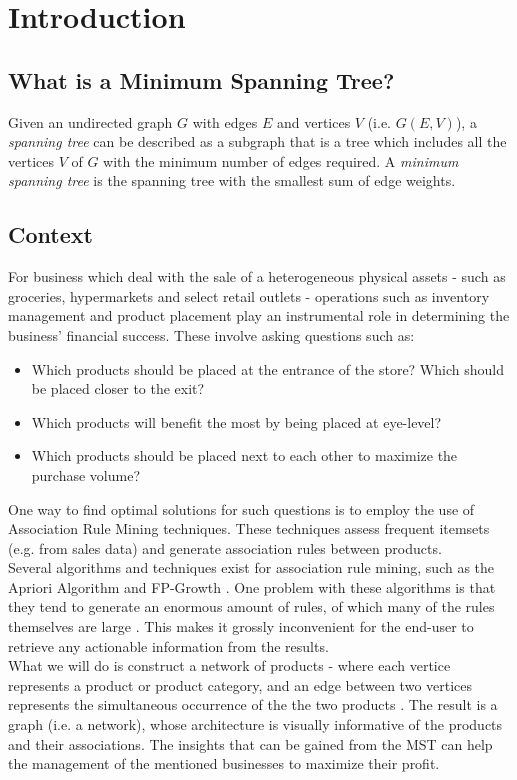 \documentclass[a4paper,11pt]{article}
\begin{document}
\newpage
\tableofcontents

\newpage
\section{Introduction}
\subsection{What is a Minimum Spanning Tree?}
Given an undirected graph $G$ with edges $E$ and vertices $V$ (i.e. $G(E,V)$), a \textit{spanning tree} can be described as a subgraph that is a tree \cite{tree} which includes all the vertices $V$ of $G$ with the minimum number of edges required. A \textit{minimum spanning tree} is the spanning tree with the smallest sum of edge weights.

\subsection{Context}
For business which deal with the sale of a heterogeneous physical assets - such as groceries, hypermarkets and select retail outlets - operations such as inventory management and product placement play an instrumental role in determining the business' financial success. These involve asking questions such as:
\begin{itemize}
\item Which products should be placed at the entrance of the store? Which should be placed closer to the exit?
\item Which products will benefit the most by being placed at eye-level?
\item Which products should be placed next to each other to maximize the purchase volume?
\end{itemize}
One way to find optimal solutions for such questions is to employ the use of Association Rule Mining techniques. These techniques assess frequent itemsets (e.g. from sales data) and generate association rules between products.\\
Several algorithms and techniques exist for association rule mining, such as the Apriori Algorithm \cite{apriori} and FP-Growth \cite{fp_growth}. One problem with these algorithms is that they tend to generate an enormous amount of rules, of which many of the rules themselves are large \cite{lot_of_rules}. This makes it grossly inconvenient for the end-user to retrieve any actionable information from the results.\\
What we will do is construct a network of products - where each vertice represents a product or product category, and an edge between two vertices represents the simultaneous occurrence of the the two products \cite{product_network}. The result is a graph (i.e. a network), whose architecture is visually informative of the products and their associations.  The insights that can be gained from the MST can help the management of the mentioned businesses to maximize their profit.
\end{document}
